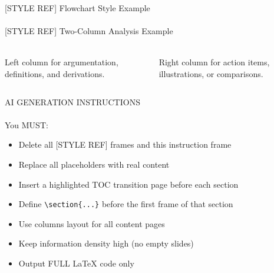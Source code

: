 \documentclass[aspectratio=169,10pt,xcolor=table]{beamer}
\begin{document}
\begin{frame}{[STYLE REF] Flowchart Style Example}
\framesubtitle{}
\centering
{}
\end{frame}

\begin{frame}{[STYLE REF] Two-Column Analysis Example}
\framesubtitle{}
\small
\begin{columns}
Left column for argumentation, definitions, and derivations.

Right column for action items, illustrations, or comparisons.
\end{columns}
\end{frame}

\begin{frame}[allowframebreaks]{AI GENERATION INSTRUCTIONS}
\framesubtitle{}
You MUST:
\begin{itemize}
\item Delete all [STYLE REF] frames and this instruction frame
\item Replace all placeholders with real content
\item Insert a highlighted TOC transition page before each section
\item Define \texttt{\textbackslash section\{...\}} before the first frame of that section
\item Use columns layout for all content pages
\item Keep information density high (no empty slides)
\item Output FULL LaTeX code only
\end{itemize}
\end{frame}

\QApage
\end{document}
